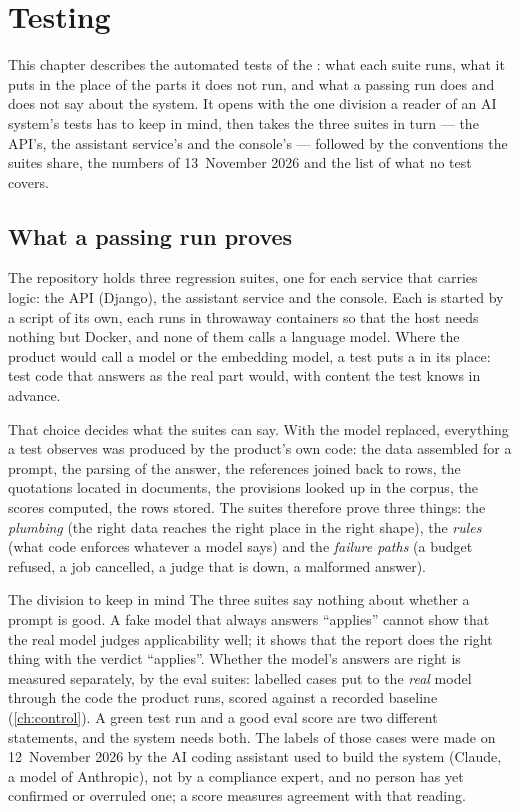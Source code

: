 \chapter{Testing}\label{ch:testing}

This chapter describes the automated tests of the \product{}: what each suite runs, what it
puts in the place of the parts it does not run, and what a passing run does and does not say
about the system. It opens with the one division a reader of an AI system's tests has to keep
in mind, then takes the three suites in turn --- the API's, the assistant service's and the
console's --- followed by the conventions the suites share, the numbers
of 13~November 2026 and the list of what no test covers.


\section{What a passing run proves}\label{sec:testing:principle}

The repository holds three regression suites, one for each service that carries logic: the API
(Django), the assistant service and the console. Each is started by a script of its own, each
runs in throwaway containers so that the host needs nothing but Docker, and none of them calls
a language model. Where the product would call a model or the embedding model, a test puts a
 in its place: test code that answers as the real part would, with content the
test knows in advance.

That choice decides what the suites can say. With the model replaced, everything a test
observes was produced by the product's own code: the data assembled for a prompt, the parsing
of the answer, the references joined back to rows, the quotations located in documents, the
provisions looked up in the corpus, the scores computed, the rows stored. The suites therefore
prove three things: the \emph{plumbing} (the right data reaches the right place in the right
shape), the \emph{rules} (what code enforces whatever a model says) and the \emph{failure
paths} (a budget refused, a job cancelled, a judge that is down, a malformed answer).

\begin{notebox}{The division to keep in mind}
The three suites say nothing about whether a prompt is good. A fake model that always answers
\enquote{applies} cannot show that the real model judges applicability well; it shows that the
report does the right thing with the verdict \enquote{applies}. Whether the model's answers
are right is measured separately, by the eval suites: labelled cases put to the \emph{real}
model through the code the product runs, scored against a recorded baseline
(\cref{ch:control}). A green test run and a good eval score are two different statements, and
the system needs both. The labels of those cases were made on 12~November 2026 by the AI coding
assistant used to build the system (Claude, a model of Anthropic), not by a compliance expert,
and no person has yet confirmed or overruled one; a score measures agreement with that reading.
\end{notebox}


